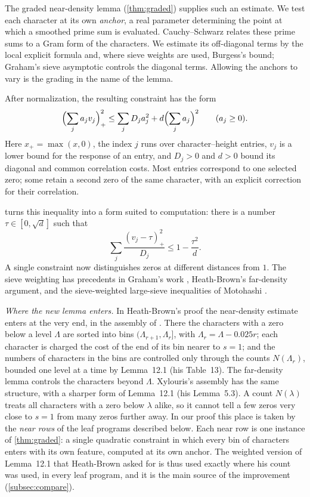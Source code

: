 \documentclass[11pt]{amsart}
\numberwithin{equation}{section}
\theoremstyle{plain}
\theoremstyle{definition}
\theoremstyle{remark}
\newcommand{\1}{\mathbf{1}}
\begin{document}
The graded near-density lemma (\cref{thm:graded}) supplies such an estimate. We test each
character at its own \emph{anchor}, a real parameter determining the point at which a
smoothed prime sum is evaluated. Cauchy--Schwarz relates these prime sums to a Gram form
of the characters. We estimate its off-diagonal terms by the local explicit formula and,
where sieve weights are used, Burgess's bound; Graham's sieve asymptotic controls the
diagonal terms. Allowing the anchors to vary is the grading in the name of the lemma.

After normalization, the resulting constraint has the form
\[
  \Bigl(\sum_j a_jv_j\Bigr)_+^2
  \le \sum_j D_ja_j^2+d\Bigl(\sum_j a_j\Bigr)^2
  \qquad(a_j\ge0).
\]
Here $x_+=\max(x,0)$, the index $j$ runs over character--height entries, $v_j$ is a lower
bound for the response of an entry, and $D_j>0$ and $d>0$ bound its diagonal and common
correlation costs. Most entries correspond to one selected zero; some retain a second zero
of the same character, with an explicit correction for their correlation.

 turns this inequality into a form suited to computation: there is a
number $\tau\in[0,\sqrt d]$ such that
\[
  \sum_j\frac{(v_j-\tau)_+^2}{D_j}\le1-\frac{\tau^2}{d}.
\]
A single constraint now distinguishes zeros at different distances from $1$.
The sieve weighting has precedents in Graham's work
\cite{Graham1977thesis,Graham1981linnik}, Heath-Brown's far-density argument, and the
sieve-weighted large-sieve inequalities of Motohashi \cite{Motohashi1975density}.

\emph{Where the new lemma enters.} In Heath-Brown's proof the near-density estimate enters at the very end, in the assembly of
\cite[\S15]{HeathBrown1992zero}. There the characters with a zero below a level $\Lambda$ are sorted into
bins $(\Lambda_{r+1},\Lambda_r]$, with $\Lambda_r=\Lambda-0.025r$; each character is charged the cost of the end of its
bin nearer to $s=1$; and the numbers of characters in the bins are controlled only through the
counts $N(\Lambda_r)$, bounded one level at a time by Lemma~12.1 (his Table~13). The far-density lemma
controls the characters beyond $\Lambda$. Xylouris's assembly \cite[\S6]{Xylouris2011nullstellen} has the same
structure, with a sharper form of Lemma~12.1 (his Lemma~5.3). A count $N(\lambda)$ treats all characters
with a zero below $\lambda$ alike, so it cannot tell a few zeros very close to $s=1$ from many zeros
further away. In our proof this place is taken by the \emph{near rows} of the leaf programs
described below. Each near row is one instance of \cref{thm:graded}: a single quadratic constraint
in which every bin of characters enters with its own feature, computed at its own anchor. The
weighted version of Lemma~12.1 that Heath-Brown asked for is thus used exactly where his count was
used, in every leaf program, and it is the main source of the improvement
(\cref{subsec:compare}).
\end{document}
